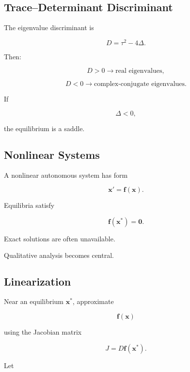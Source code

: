 \subsection{Trace--Determinant Discriminant}
\label{subsec:trace-determinant-discriminant}

The eigenvalue discriminant is

\[
\boxed{
D
=
\tau^2
-
4\Delta.
}
\]

Then:

\[
\boxed{
D>0
\rightarrow
\text{real eigenvalues},
}
\]

\[
\boxed{
D<0
\rightarrow
\text{complex-conjugate eigenvalues}.
}
\]

If

\[
\Delta<0,
\]

the equilibrium is a saddle.

\subsection{Nonlinear Systems}
\label{subsec:nonlinear-ode-systems}

A nonlinear autonomous system has form

\[
\boxed{
\mathbf{x}'
=
\mathbf{f}(\mathbf{x}).
}
\]

Equilibria satisfy

\[
\boxed{
\mathbf{f}(\mathbf{x}^*)
=
\mathbf{0}.
}
\]

Exact solutions are often unavailable.

Qualitative analysis becomes central.

\subsection{Linearization}
\label{subsec:ode-linearization}

Near an equilibrium \(\mathbf{x}^*\), approximate

\[
\mathbf{f}(\mathbf{x})
\]

using the Jacobian matrix

\[
\boxed{
J
=
D\mathbf{f}
(
\mathbf{x}^*
).
}
\]

Let

